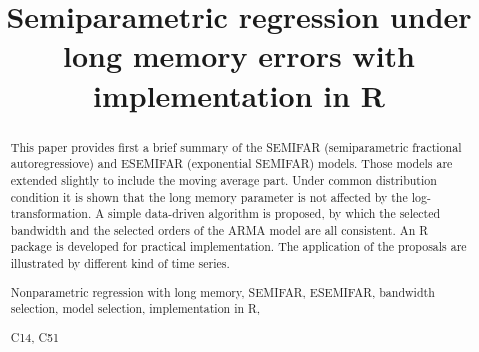 \documentclass[12pt]{article}
\begin{document}
\renewcommand{\thetheorem}{\arabic{theorem}.}
\renewcommand{\theremark}{\arabic{remark}.}
\renewcommand{\thelemma}{\arabic{lemma}.}
\renewcommand{\proposition}{\arabic{proposition}.}



\title{Semiparametric regression under long memory errors with implementation in R}









\begin{abstract}
\noindent 
This paper provides first a brief summary of the SEMIFAR (semiparametric fractional autoregressiove) and ESEMIFAR (exponential SEMIFAR) models. Those models are extended slightly to include the moving average part. Under common distribution condition it is shown that the long memory parameter is not affected by the log-transformation. 
A simple data-driven algorithm is proposed, by which the selected bandwidth and the selected orders of the ARMA model are all consistent. An R package is developed for practical implementation. The application of the proposals are illustrated by different kind of time series. 

  
%

\vspace{.3cm}

 Nonparametric regression with long memory, SEMIFAR, ESEMIFAR, bandwidth selection, model selection, implementation in R, 


\vspace{.3cm}

 C14, C51
\end{abstract}


\vspace{.5cm}
\end{document}
